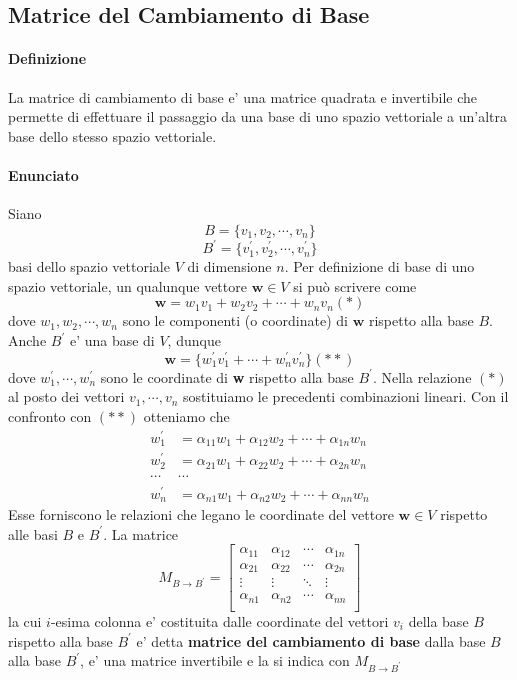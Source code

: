 \documentclass[a4paper, 10pt]{article}
\begin{document}
	\subsection{Matrice del Cambiamento di Base}
	\paragraph{Definizione} 
	La matrice di cambiamento di base e' una matrice quadrata e invertibile che permette di effettuare 
	il passaggio da una base di uno spazio vettoriale a un'altra base dello stesso spazio vettoriale. \\
	\paragraph*{Enunciato} 
	Siano \[ B = \lbrace v_1, v_2 , \cdots, v_n \rbrace \] \[ B^{'}=\lbrace v_{1}^{'}, v_{2}^{'}, \cdots, v_{n}^{'} \rbrace \]
	basi dello spazio vettoriale $V$ di dimensione $n$. Per definizione di base di uno spazio vettoriale, 
	un qualunque vettore $\textbf{w} \in V$ si può scrivere come \[ \textbf{w} = w_1v_1 + w_2 v_2 + \cdots + w_n v_n (*) \]
	dove $w_1, w_2, \cdots, w_n$ sono le componenti (o coordinate) di $\textbf{w}$ rispetto alla base $B$. 
	Anche $B^{'}$ e' una base di $V$, dunque 
	\[ \textbf{w} = \lbrace w_{1}^{'} v^{'}_1 + \cdots + w_{n}^{'} v^{'}_n \rbrace (**) \] dove $w_1^{'}, \cdots, w_n^{'}$ 
	sono le coordinate di \textbf{w} rispetto alla base $B^{'}$. Nella relazione $(*)$ al posto dei vettori $v_1, 
	\cdots, v_n$ sostituiamo le precedenti combinazioni lineari.  Con il confronto con $(**)$ otteniamo che 
	\begin{equation*}
		\begin{split}
			w^{'}_1 &= \alpha_{11}w_1 + \alpha_{12}w_2 + \cdots + \alpha_{1n}w_n  \\
			w^{'}_2 &= \alpha_{21}w_1 + \alpha_{22}w_2 + \cdots + \alpha_{2n}w_n \\
			\cdots & \cdots \\
			w^{'}_n &= \alpha_{n1}w_1 + \alpha_{n2}w_2 + \cdots + \alpha_{nn}w_n 
		\end{split}
	\end{equation*}
	Esse forniscono le relazioni che legano le coordinate del vettore $\textbf{w} \in V$ rispetto alle basi $B$ e $B^{'}$.
	La matrice 
	\[ M_{B \rightarrow B^{'}} = \begin{bmatrix}
		\alpha_{11} & \alpha_{12} & \cdots  & \alpha_{1n} \\
		\alpha_{21} & \alpha_{22} & \cdots  & \alpha_{2n} \\
		\vdots & \vdots & \ddots & \vdots \\
		\alpha_{n1} & \alpha_{n2} & \cdots  & \alpha_{nn} \\
	\end{bmatrix} \]
	la cui $i$-esima colonna e' costituita dalle coordinate del vettori $v_i$ della base $B$ rispetto alla base
	$B^{'}$ e' detta \textbf{matrice del cambiamento di base} dalla base $B$ alla base $B^{'}$, e' una matrice invertibile 
	e la si indica con $M_{B \rightarrow B^{'}}$
	
\end{document}
